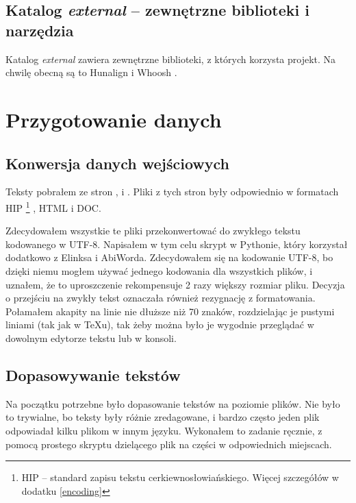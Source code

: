 \documentclass{pracamgr}
\begin{document}
\section{Katalog \textit{external} -- zewnętrzne biblioteki i narzędzia}

Katalog \textit{external} zawiera zewnętrzne biblioteki, z których
korzysta projekt. Na chwilę obecną są to Hunalign \cite {hunalign} i
Whoosh \cite {Whoosh}.


\chapter{Przygotowanie danych}

\section{Konwersja danych wejściowych}

Teksty pobrałem ze stron \cite{orthlib}, \cite{analogion} i
\cite{liturgia}. Pliki z tych stron były odpowiednio w formatach
HIP \footnote{HIP -- standard zapisu tekstu
  cerkiewno\-{}słowiańskiego. Więcej szczegółów w dodatku \ref{encoding}} ,
HTML i DOC.

Zdecydowałem wszystkie te pliki przekonwertować do zwykłego tekstu
kodowanego w UTF-8. Napisałem w tym celu skrypt w Pythonie, który
korzystał dodatkowo z Elinksa i AbiWorda. Zdecydowałem się na
kodowanie UTF-8, bo dzięki niemu mogłem używać jednego kodowania dla
wszystkich plików, i uznałem, że to uproszczenie rekompensuje 2 razy
większy rozmiar pliku. Decyzja o przejściu na zwykły tekst oznaczała
również rezygnację z formatowania. Połamałem akapity na linie nie
dłuższe niż 70 znaków, rozdzielając je pustymi liniami (tak jak w
TeXu), tak żeby można było je wygodnie przeglądać w dowolnym edytorze
tekstu lub w konsoli.

\section{Dopasowywanie tekstów}

Na początku potrzebne było dopasowanie tekstów na poziomie plików. Nie
było to trywialne, bo teksty były różnie zredagowane, i bardzo często
jeden plik odpowiadał kilku plikom w innym języku. Wykonałem to
zadanie ręcznie, z pomocą prostego skryptu dzielącego plik na części w
odpowiednich miejscach.

\end{document}
